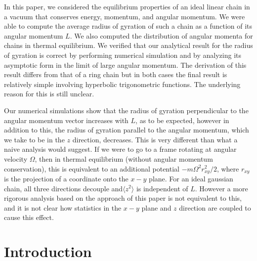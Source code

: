 \documentclass[pre,showpacs]{revtex4}
\begin{document}
In this paper, we considered the equilibrium properties of an ideal linear chain in a vacuum
that conserves energy, momentum, and angular momentum. We were able to compute the average
radius of gyration of such a chain as a function of its angular momentum $L$. We also computed
the distribution of angular momenta for chains in thermal equilibrium. 
We verified that our analytical result for the radius of gyration is correct by performing
numerical simulation and by analyzing its asymptotic form in the limit of large angular momentum.
The derivation of this result differs from that of a ring chain but in both cases the final
result is relatively simple involving hyperbolic trigonometric functions. The underlying reason
for this is still unclear.

Our numerical simulations show that the radius of gyration perpendicular
to the angular momentum vector increases with $L$, as to be expected,
however in addition to this, the radius of gyration parallel to the
angular momentum, which we take to be in the $z$ direction, decreases.
This is very different than what a naive analysis would suggest. If we
were to go to a frame rotating at angular velocity $\Omega$, then in
thermal equilibrium (without angular momentum conservation), this is
equivalent to an additional potential $- m \Omega^2 r^2_{xy}/2$, where
$r_{xy}$ is the projection of a coordinate onto the $x-y$ plane.  For an ideal
gaussian chain, all three directions decouple and$\langle z^2\rangle$
is independent of $L$. However a more rigorous analysis based on the
approach of this paper is not equivalent to this, and it is not clear
how statistics in the $x-y$ plane and $z$ direction are coupled to cause
this effect.







\section{Introduction}
\end{document}
